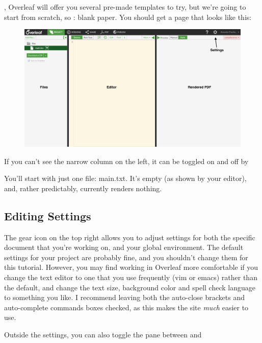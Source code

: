 \documentclass[12pt]{article}
\begin{document}
, Overleaf will offer you several pre-made templates to try, but we're going to start from scratch, so : blank paper. You should get a page that looks like this:
\begin{figure}[H]
\includegraphics[width=\textwidth]{Images/Labelempty.png}
\end{figure}
If you can't see the narrow column on the left, it can be toggled on and off by 

You'll start with just one file: main.txt. It's empty (as shown by your editor), and, rather predictably, currently renders nothing.

\subsection{Editing Settings}
The gear icon on the top right allows you to adjust settings for both the specific document that you're working on, and your global environment. The default settings for your project are probably fine, and you shouldn't change them for this tutorial. However, you may find working in Overleaf more comfortable if you change the text editor to one that you use frequently (vim or emacs) rather than the default, and change the text size, background color and spell check language to something you like. I recommend leaving both the auto-close brackets and auto-complete commands boxes checked, as this makes the site \emph{much} easier to use.

Outside the settings, you can also toggle the  pane between  and 
\end{document}
